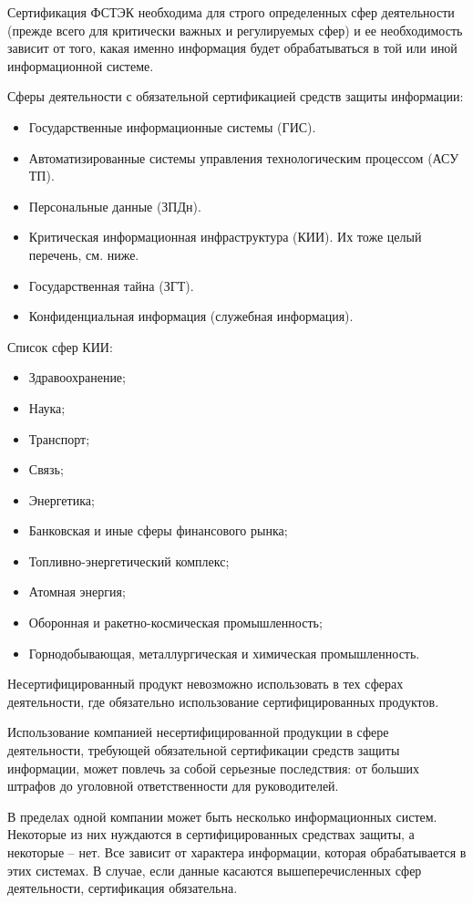 Сертификация ФСТЭК необходима для строго определенных сфер деятельности (прежде всего для критически важных и регулируемых сфер) и ее необходимость зависит от того, какая именно информация будет обрабатываться в той или иной информационной системе.

Сферы деятельности с обязательной сертификацией средств защиты информации:
\begin{itemize}
    \item Государственные информационные системы (ГИС).
    \item Автоматизированные системы управления технологическим процессом (АСУ ТП).
    \item Персональные данные (ЗПДн).
    \item Критическая информационная инфраструктура (КИИ). Их тоже целый перечень, см. ниже.
    \item Государственная тайна (ЗГТ).
    \item Конфиденциальная информация (служебная информация).
\end{itemize}

Список сфер КИИ:
\begin{itemize}
    \item Здравоохранение;
    \item Наука;
    \item Транспорт;
    \item Связь;
    \item Энергетика;
    \item Банковская и иные сферы финансового рынка;
    \item Топливно-энергетический комплекс;
    \item Атомная энергия;
    \item Оборонная и ракетно-космическая промышленность;
    \item Горнодобывающая, металлургическая и химическая промышленность.
\end{itemize}

Несертифицированный продукт невозможно использовать в тех сферах деятельности, где обязательно использование сертифицированных продуктов.

Использование компанией несертифицированной продукции в сфере деятельности, требующей обязательной сертификации средств защиты информации, может повлечь за собой серьезные последствия: от больших штрафов до уголовной ответственности для руководителей.

В пределах одной компании может быть несколько информационных систем. Некоторые из них нуждаются в сертифицированных средствах защиты, а некоторые – нет. Все зависит от характера информации, которая обрабатывается в этих системах. В случае, если данные касаются вышеперечисленных сфер деятельности, сертификация обязательна.

